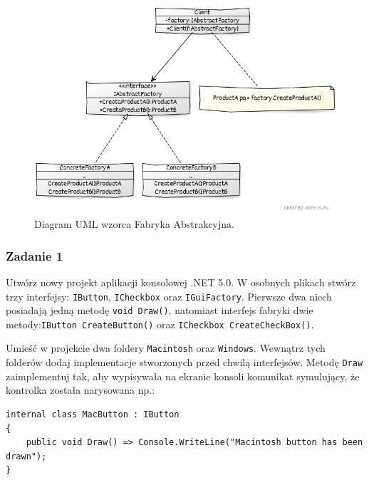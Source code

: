 \begin{figure}[hbt!]
	\centering
	\includegraphics[width=0.9\linewidth]{images/AbstractFactoryUml}
	\caption{Diagram UML wzorca Fabryka Abstrakcyjna.}
	\label{lab2/fig/AbstractFactoryUml}
\end{figure}
%


\subsubsection{Zadanie 1}

Utwórz nowy projekt aplikacji konsolowej .NET 5.0. W osobnych plikach stwórz trzy interfejsy: \texttt{IButton}, \texttt{ICheckbox} oraz \texttt{IGuiFactory}. Pierwsze dwa niech posiadają jedną metodę \texttt{void Draw()}, natomiast interfejs fabryki dwie metody:\texttt{IButton CreateButton()} oraz \texttt{ICheckbox CreateCheckBox()}.

Umieść w projekcie dwa foldery \texttt{Macintosh} oraz \texttt{Windows}. Wewnątrz tych folderów dodaj implementacje stworzonych przed chwilą interfejsów. Metodę \texttt{Draw} zaimplementuj tak, aby wypisywała na ekranie konsoli komunikat symulujący, że kontrolka została narysowana np.:
\begin{lstlisting}
internal class MacButton : IButton
{
	public void Draw() => Console.WriteLine("Macintosh button has been drawn");
}
\end{lstlisting}

